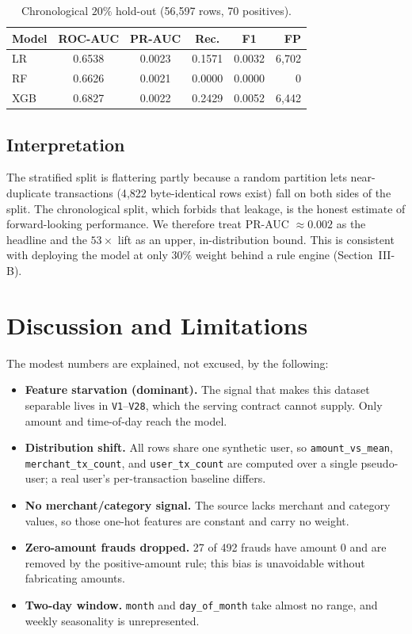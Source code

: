 \documentclass[conference]{IEEEtran}
\begin{document}
\begin{table}[t]
\centering
\caption{Chronological $20\%$ hold-out (56{,}597 rows, 70 positives).}
\label{tab:chrono}
\begin{tabular}{@{}lccccr@{}}
\hline
\textbf{Model} & \textbf{ROC-AUC} & \textbf{PR-AUC} & \textbf{Rec.} &
\textbf{F1} & \textbf{FP} \\
\hline
LR  & 0.6538 & 0.0023 & 0.1571 & 0.0032 & 6{,}702 \\
RF  & 0.6626 & 0.0021 & 0.0000 & 0.0000 & 0 \\
XGB & 0.6827 & 0.0022 & 0.2429 & 0.0052 & 6{,}442 \\
\hline
\end{tabular}
\end{table}

\subsection{Interpretation}
The stratified split is flattering partly because a random partition lets
near-duplicate transactions (4{,}822 byte-identical rows exist) fall on both
sides of the split. The chronological split, which forbids that leakage,
is the honest estimate of forward-looking performance. We therefore treat
PR-AUC $\approx 0.002$ as the headline and the $53\times$ lift as an
upper, in-distribution bound. This is consistent with deploying the model at
only $30\%$ weight behind a rule engine (Section~III-B).

\section{Discussion and Limitations}
The modest numbers are explained, not excused, by the following:

\begin{itemize}
\item \textbf{Feature starvation (dominant).} The signal that makes this
dataset separable lives in \texttt{V1}--\texttt{V28}, which the serving
contract cannot supply. Only amount and time-of-day reach the model.
\item \textbf{Distribution shift.} All rows share one synthetic user, so
\texttt{amount\_vs\_mean}, \texttt{merchant\_tx\_count}, and
\texttt{user\_tx\_count} are computed over a single pseudo-user; a real
user's per-transaction baseline differs.
\item \textbf{No merchant/category signal.} The source lacks merchant and
category values, so those one-hot features are constant and carry no weight.
\item \textbf{Zero-amount frauds dropped.} 27 of 492 frauds have amount $0$
and are removed by the positive-amount rule; this bias is unavoidable without
fabricating amounts.
\item \textbf{Two-day window.} \texttt{month} and \texttt{day\_of\_month} take
almost no range, and weekly seasonality is unrepresented.
\end{itemize}
\end{document}
